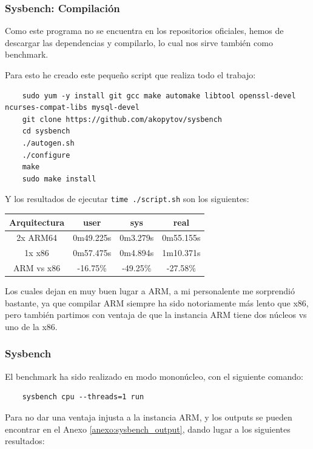 \documentclass[a4paper,openright,12pt]{article}
\begin{document}
\subsubsection{Sysbench: Compilación}
Como este programa no se encuentra en los repositorios oficiales, hemos de descargar las dependencias y compilarlo, lo cual nos sirve también como benchmark.

Para esto he creado este pequeño script que realiza todo el trabajo:
\begin{verbatim}
    sudo yum -y install git gcc make automake libtool openssl-devel ncurses-compat-libs mysql-devel
    git clone https://github.com/akopytov/sysbench
    cd sysbench
    ./autogen.sh
    ./configure
    make
    sudo make install
\end{verbatim}

Y los resultados de ejecutar \texttt{time ./script.sh} son los siguientes:
\begin{center}
\begin{tabular}{ | c | c | c | c | }
    \hline
    Arquitectura           &   user        &   sys         &   real        \\
    \hline
    2x ARM64               &   0m49.225s   &   0m3.279s    &   0m55.155s   \\
    \hline
    1x x86                 &   0m57.475s   &   0m4.894s    &   1m10.371s   \\
    \hline
    \hline
    ARM vs x86             &   -16.75\%    &   -49.25\%    &   -27.58\%    \\
    \hline
\end{tabular}
\end{center}

Los cuales dejan en muy buen lugar a ARM, a mi personalente me sorprendió bastante, ya que compilar ARM siempre ha sido notoriamente más lento que x86, pero también partimos con ventaja
de que la instancia ARM tiene dos núcleos vs uno de la x86.

\subsubsection{Sysbench}
El benchmark ha sido realizado en modo mononúcleo, con el siguiente comando:
\begin{verbatim}
    sysbench cpu --threads=1 run
\end{verbatim}

Para no dar una ventaja injusta a la instancia ARM, y los outputs se pueden encontrar en el Anexo \ref{anexo:sysbench_output}, dando lugar
a los siguientes resultados:
\end{document}
